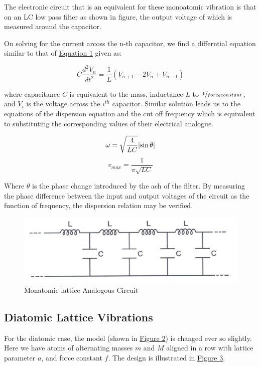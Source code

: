		The electronic circuit that is an equivalent for these monoatomic vibration is that on an LC low pass filter as shown in figure, the output voltage of which is measured around the capacitor.

		On solving for the current arcoss the n-th capacitor, we find a differntial equation similar to that of \hyperref[eqn:1]{Equation 1} given as:

		$$C\frac{d^2V_n}{dt^2} = \frac{1}{L}(V_{n+1} - 2V_n + V_{n-1})$$

		where capacitance $C$ is equivalent to the mass, inductance $L$ to $\sfrac{1}{force constant}$, and $V_i$ is the voltage across the $i^{th}$ capacitor. Similar solution leads us to the equations of 		the dispersion equation and the cut off frequency which is equivalent to substituting the corresponding values of their electrical analogue.

		
		$$\omega = \sqrt{\frac{4}{LC}}\abs{\sin\theta}$$
		\begin{equation}
			v_{max} = \frac{1}{\pi\sqrt{LC}}
			\label{eqn:2}
		\end{equation}

		Where $\theta$ is the phase change introduced by the ach of the filter. By measuring the phase difference between the input and output voltages of the circuit as the function of frequency, the dispersion relation may be verified.

		\begin{figure}[h]
			\centering
			\includegraphics[width=0.9\columnwidth]{images/circ1.png}
			\caption{Monatomic lattice Analogous Circuit}
			\label{fig:circ1}
		\end{figure}

	\subsection{Diatomic Lattice Vibrations}
		For the diatomic case, the model (shown in \hyperref[fig:theory2]{Figure 2}) is changed ever so slightly. Here we have atoms of alternating masses $m$ and $M$ aligned in a row with lattice parameter $a$, and force constant $f$. The design is illustrated in \hyperref[fig:theory3]{Figure 3}.

